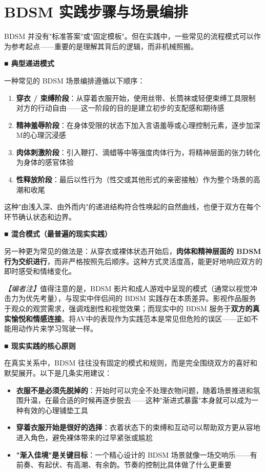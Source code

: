 \documentclass[12pt,UTF8]{ctexbook}
\begin{document}
\section{BDSM 实践步骤与场景编排}

BDSM 并没有"标准答案"或"固定模板"。但在实践中，一些常见的流程模式可以作为参考起点——重要的是理解其背后的逻辑，而非机械照搬。

\noindent\textbf{■ 典型递进模式}

一种常见的 BDSM 场景编排遵循以下顺序：

\begin{enumerate}
	\item \textbf{穿衣 / 束缚阶段}：从穿着衣服开始，使用丝带、长筒袜或轻便束缚工具限制对方的行动自由——这一阶段的目的是建立初步的支配感和期待感
	\item \textbf{精神羞辱阶段}：在身体受限的状态下加入言语羞辱或心理控制元素，逐步加深M的心理沉浸感
	\item \textbf{肉体刺激阶段}：引入鞭打、滴蜡等中等强度肉体行为，将精神层面的张力转化为身体的感官体验
	\item \textbf{性释放阶段}：最后以性行为（性交或其他形式的亲密接触）作为整个场景的高潮和收尾
\end{enumerate}

这种"由浅入深、由外而内"的递进结构符合性唤起的自然曲线，也便于双方在每个环节确认状态和边界。

\noindent\textbf{■ 混合模式（最普遍的现实实践）}

另一种更为常见的做法是：从穿衣或裸体状态开始后，\textbf{肉体和精神层面的 BDSM 行为交织进行}，而非严格按照先后顺序。这种方式灵活度高，能更好地响应双方的即时感受和情绪变化。

\textit{【编者注】}值得注意的是，BDSM 影片和成人游戏中呈现的模式（通常以视觉冲击力为优先考量），与现实中伴侣间的 BDSM 实践存在本质差异。影视作品服务于观众的观赏需求，强调戏剧性和视觉效果；而现实中的 BDSM 服务于\textbf{双方的真实愉悦和情感连接}。将AV中的表现作为实践范本是常见但危险的误区——正如不能用动作片来学习驾驶一样。

\noindent\textbf{■ 现实实践的核心原则}

在真实关系中，BDSM 往往没有固定的模式和规则，而是完全围绕双方的喜好和默契展开。以下是几条实用建议：

\begin{itemize}
	\item \textbf{衣服不是必须先脱掉的}：开始时可以完全不处理衣物问题，随着场景推进和氛围升温，在最合适的时候再逐步脱去——这种"渐进式暴露"本身就可以成为一种有效的心理铺垫工具
	\item \textbf{穿着衣服开始是很好的选择}：衣着状态下的束缚和互动可以帮助双方更从容地进入角色，避免裸体带来的过早紧张或尴尬
	\item \textbf{"渐入佳境"是关键目标}：一个精心设计的 BDSM 场景就像一场交响乐——有前奏、有起伏、有高潮、有余韵。节奏的控制比具体做了什么更重要
\end{itemize}
\end{document}
